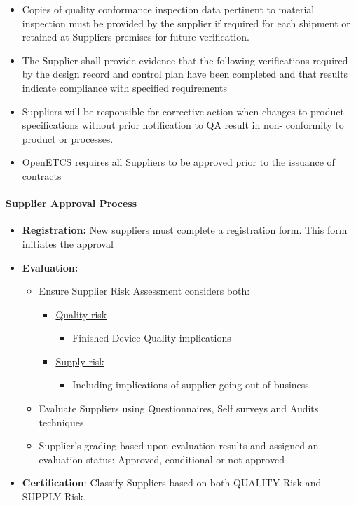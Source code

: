 \documentclass{template/openetcs_article}
\begin{document}
\begin{itemize}
\item Copies of quality conformance inspection data pertinent to material inspection must be provided by the supplier if required for each shipment or retained at Suppliers premises for future verification.
\item The Supplier shall provide evidence that the following verifications required by the design record and control plan have been completed and that results indicate compliance with specified requirements
\item Suppliers will be responsible for corrective action when changes to product specifications without prior notification to QA result in non- conformity to product or processes.
\item OpenETCS requires all Suppliers to be approved prior to the issuance of contracts
\end{itemize}

\paragraph{Supplier Approval Process}
\begin{itemize}
\item \textbf{Registration:} New suppliers must complete a registration form. This form initiates the approval 
\item \textbf{Evaluation:} 
\begin{itemize}
\item Ensure Supplier Risk Assessment considers both:
\begin{itemize}
\item \underline{Quality risk}
\begin{itemize}
\item Finished Device Quality implications
\end{itemize}
\item \underline{Supply risk}
\begin{itemize}
\item Including implications of supplier going out of business
\end{itemize}
\end{itemize}
\item Evaluate Suppliers using Questionnaires, Self surveys and Audits techniques
\item Supplier’s grading based upon evaluation results and assigned an evaluation status: Approved, conditional or not approved
\end{itemize}
\item \textbf{Certification}: Classify Suppliers based on both QUALITY Risk and SUPPLY Risk.
\end{itemize}
\end{document}
